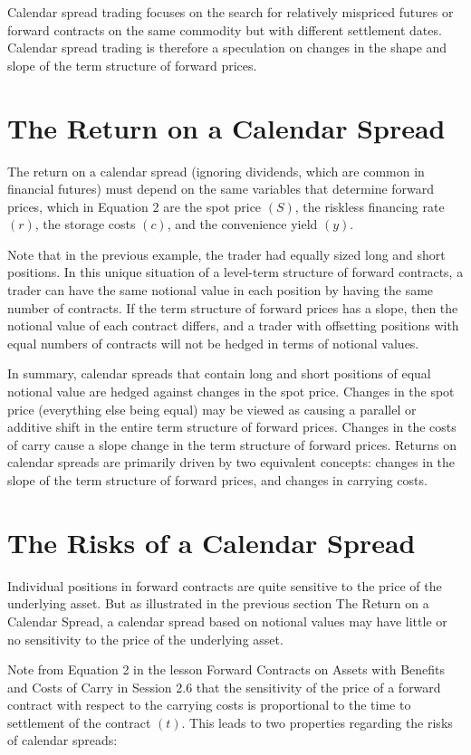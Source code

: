 \documentclass[11pt]{article}
\begin{document}
Calendar spread trading focuses on the search for relatively mispriced futures or forward contracts on the same commodity but with different settlement dates. Calendar spread trading is therefore a speculation on changes in the shape and slope of the term structure of forward prices.

\section*{The Return on a Calendar Spread}
The return on a calendar spread (ignoring dividends, which are common in financial futures) must depend on the same variables that determine forward prices, which in Equation 2 are the spot price $(S)$, the riskless financing rate $(r)$, the storage costs $(c)$, and the convenience yield $(y)$.

Note that in the previous example, the trader had equally sized long and short positions. In this unique situation of a level-term structure of forward contracts, a trader can have the same notional value in each position by having the same number of contracts. If the term structure of forward prices has a slope, then the notional value of each contract differs, and a trader with offsetting positions with equal numbers of contracts will not be hedged in terms of notional values.

In summary, calendar spreads that contain long and short positions of equal notional value are hedged against changes in the spot price. Changes in the spot price (everything else being equal) may be viewed as causing a parallel or additive shift in the entire term structure of forward prices. Changes in the costs of carry cause a slope change in the term structure of forward prices. Returns on calendar spreads are primarily driven by two equivalent concepts: changes in the slope of the term structure of forward prices, and changes in carrying costs.

\section*{The Risks of a Calendar Spread}
Individual positions in forward contracts are quite sensitive to the price of the underlying asset. But as illustrated in the previous section The Return on a Calendar Spread, a calendar spread based on notional values may have little or no sensitivity to the price of the underlying asset.

Note from Equation 2 in the lesson Forward Contracts on Assets with Benefits and Costs of Carry in Session 2.6 that the sensitivity of the price of a forward contract with respect to the carrying costs is proportional to the time to settlement of the contract $(t)$. This leads to two properties regarding the risks of calendar spreads:
\end{document}
